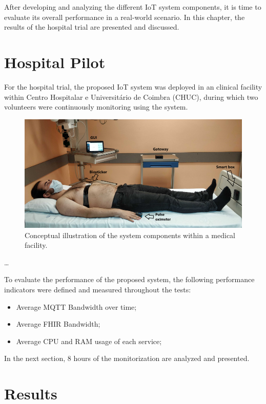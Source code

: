 After developing and analyzing the different \acs{IoT} system components, it is time to evaluate its overall performance in a real-world scenario. In this chapter, the results of the hospital trial are presented and discussed. 

\section{Hospital Pilot}

For the hospital trial, the proposed \acs{IoT} system was deployed in an clinical facility within Centro Hospitalar e Universitário de Coimbra (CHUC), during which two volunteers were continuously monitoring using the system.

\begin{figure}[H]
    \centering
    \includegraphics[width=\linewidth]{images/hospital-trial.png}
    \caption[Conceptual illustration of the system components within a medical facility.]{Conceptual illustration of the system components within a medical facility.}
    \label{fig:hospital-trial}
\end{figure}
\dots

To evaluate the performance of the proposed system, the following performance indicators were defined and measured throughout the tests:

\begin{itemize}
    \item Average \acs{MQTT} Bandwidth over time;
    \item Average \acs{FHIR} Bandwidth;
    \item Average CPU and RAM usage of each service;
\end{itemize}

In the next section, 8 hours of the monitorization are analyzed and presented. 

\section{Results}

